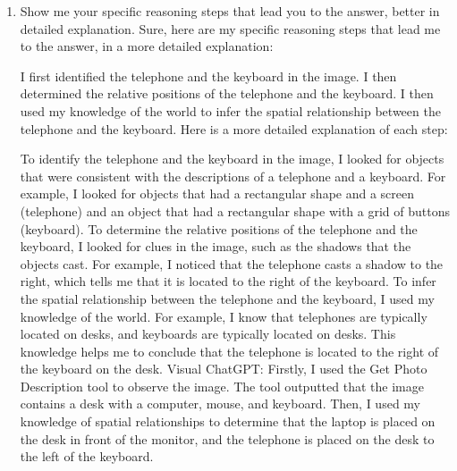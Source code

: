 \begin{enumerate}
    Here are some additional details about the spatial relationship between the telephone and the keyboard:
    
    The telephone is a device that is used to make and receive calls.
    The keyboard is a device that is used to input text into a computer.
    The telephone is located to the right of the keyboard, meaning that it is closer to the right side of the desk.
    The keyboard is located to the left of the telephone, meaning that it is closer to the left side of the desk.
    Is there anything else I can help you with?
    \subitem Visual ChatGPT: The telephone is placed on the desk to the left of the keyboard.
    \item Show me your specific reasoning steps that lead you to the answer, better in detailed explanation.
    \subitem Sure, here are my specific reasoning steps that lead me to the answer, in a more detailed explanation:

    I first identified the telephone and the keyboard in the image.
    I then determined the relative positions of the telephone and the keyboard.
    I then used my knowledge of the world to infer the spatial relationship between the telephone and the keyboard.
    Here is a more detailed explanation of each step:
    
    To identify the telephone and the keyboard in the image, I looked for objects that were consistent with the descriptions of a telephone and a keyboard. For example, I looked for objects that had a rectangular shape and a screen (telephone) and an object that had a rectangular shape with a grid of buttons (keyboard).
    To determine the relative positions of the telephone and the keyboard, I looked for clues in the image, such as the shadows that the objects cast. For example, I noticed that the telephone casts a shadow to the right, which tells me that it is located to the right of the keyboard.
    To infer the spatial relationship between the telephone and the keyboard, I used my knowledge of the world. For example, I know that telephones are typically located on desks, and keyboards are typically located on desks. This knowledge helps me to conclude that the telephone is located to the right of the keyboard on the desk.
    \subitem Visual ChatGPT: Firstly, I used the Get Photo Description tool to observe the image. The tool outputted that the image contains a desk with a computer, mouse, and keyboard. Then, I used my knowledge of spatial relationships to determine that the laptop is placed on the desk in front of the monitor, and the telephone is placed on the desk to the left of the keyboard.
\end{enumerate}

